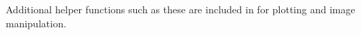 Additional helper functions such as these are included in  for plotting and image manipulation.








%
%
%













